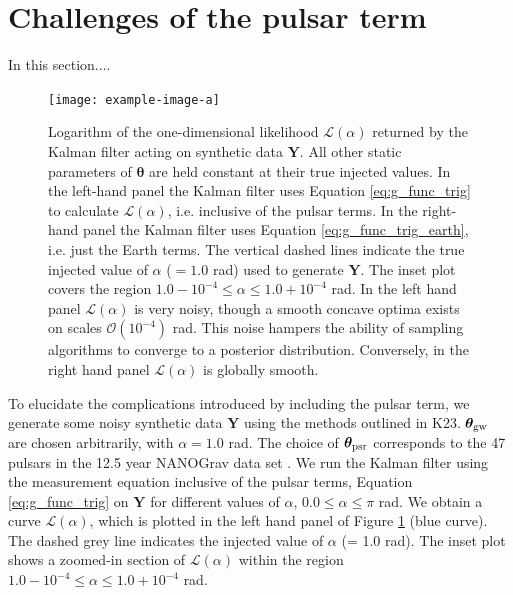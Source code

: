 \documentclass[fleqn,usenatbib,useAMS]{mnras}
\begin{document}
\section{}




\section{Challenges of the pulsar term}\label{sec:psr_term_challenges}
In this section....

\begin{figure}
	\texttt{[image: example-image-a]}
	\caption{Logarithm of the one-dimensional likelihood $\mathcal{L}(\alpha)$ returned by the Kalman filter acting on synthetic data $\boldsymbol{Y}$. All other static parameters of $\boldsymbol{\theta}$ are held constant at their true injected values. In the left-hand panel the Kalman filter uses Equation \eqref{eq:g_func_trig} to calculate $\mathcal{L}(\alpha)$, i.e. inclusive of the pulsar terms. In the right-hand panel the Kalman filter uses Equation \ref{eq:g_func_trig_earth}, i.e. just the Earth terms. The vertical dashed lines indicate the true injected value of $\alpha$ ($=1.0$ rad) used to generate $\boldsymbol{Y}$. The inset plot covers the region $1.0 - 10^{-4} \le \alpha \le 1.0 +10^{-4}$ rad. In the left hand panel $\mathcal{L}(\alpha)$ is very noisy, though a smooth concave optima exists on scales $\mathcal{O}(10^{-4})$ rad. This noise hampers the ability of sampling algorithms to converge to a posterior distribution. Conversely, in the right hand panel $\mathcal{L}(\alpha)$ is globally smooth. }
	\label{fig:likelihood_comparison}
\end{figure}




To elucidate the complications introduced by including the pulsar term, we generate some noisy synthetic data $\boldsymbol{Y}$ using the methods outlined in K23. $\boldsymbol{\theta}_{\rm gw}$ are chosen arbitrarily, with $\alpha = 1.0 $ rad.
The choice of $\boldsymbol{\theta}_{\rm psr}$ corresponds to the 47 pulsars in the 12.5 year NANOGrav data set  \citep{2020ApJ...905L..34A}. We run the Kalman filter using the measurement equation inclusive of the pulsar terms, Equation \eqref{eq:g_func_trig} on $\boldsymbol{Y}$ for different values of $\alpha$, $ 0.0 \le \alpha \le \pi$ rad. We obtain a curve $\mathcal{L}(\alpha)$, which is plotted in the left hand panel of Figure \ref{fig:likelihood_comparison} (blue curve). The dashed grey line indicates the injected value of $\alpha$ (= 1.0 rad). The inset plot shows a zoomed-in section of $\mathcal{L}(\alpha)$ within the region $ 1.0 - 10^{-4} \le \alpha \le 1.0 +10^{-4}$ rad. \newline 
\end{document}
